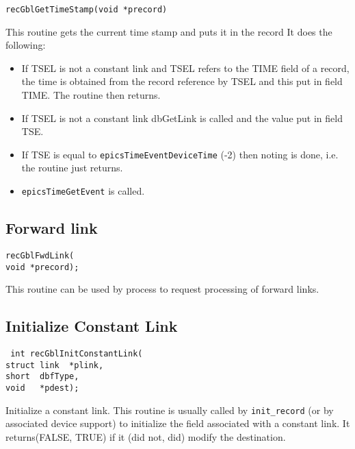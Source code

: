 \begin{verbatim}recGblGetTimeStamp(void *precord)
\end{verbatim}This routine gets the current time stamp and puts it in the record It does the following:

\begin{itemize}\item If TSEL is not a constant link and TSEL refers to the TIME field of a record, the time is obtained from the record 
reference by TSEL and this put in field TIME. The routine then returns.

\item If TSEL is not a constant link dbGetLink is called and the value put in field TSE.

\item If TSE is equal to \verb|epicsTimeEventDeviceTime|  (-2) then noting is done, i.e. the routine just returns.

\item \verb|epicsTimeGetEvent| is called.

\end{itemize}\subsection{Forward link}

\begin{verbatim}recGblFwdLink(
void *precord);
\end{verbatim}This routine can be used by process to request processing of forward links.

\subsection{Initialize Constant Link}

\begin{verbatim} int recGblInitConstantLink(
struct link  *plink,
short  dbfType,
void   *pdest);
\end{verbatim}Initialize a constant link. This routine is usually called by \verb|init_record| (or by associated device support) to initialize 
the field associated with a constant link. It returns(FALSE, TRUE) if it (did not, did) modify the destination.










